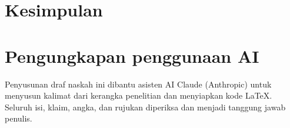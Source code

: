 \section{Kesimpulan}
\label{sec:kesimpulan}


\section*{Pengungkapan penggunaan AI}
Penyusunan draf naskah ini dibantu asisten AI Claude (Anthropic) untuk menyusun kalimat dari kerangka penelitian dan menyiapkan kode \LaTeX{}. Seluruh isi, klaim, angka, dan rujukan diperiksa dan menjadi tanggung jawab penulis.
